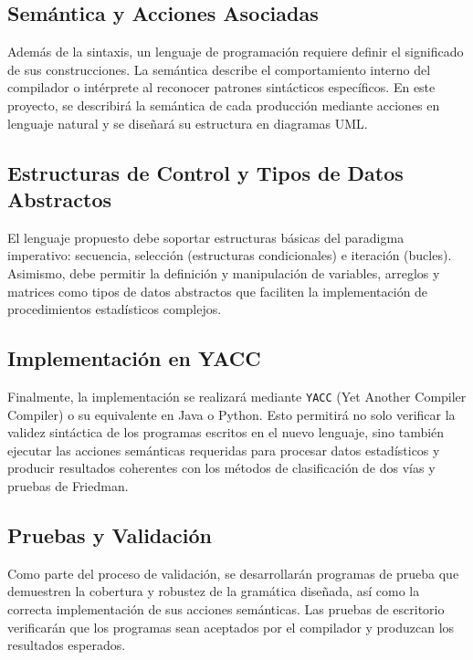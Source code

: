\documentclass{article}
\begin{document}
\subsection*{Semántica y Acciones Asociadas}

Además de la sintaxis, un lenguaje de programación requiere definir el significado de sus construcciones. La semántica describe el comportamiento interno del compilador o intérprete al reconocer patrones sintácticos específicos. En este proyecto, se describirá la semántica de cada producción mediante acciones en lenguaje natural y se diseñará su estructura en diagramas UML.

\subsection*{Estructuras de Control y Tipos de Datos Abstractos}

El lenguaje propuesto debe soportar estructuras básicas del paradigma imperativo: secuencia, selección (estructuras condicionales) e iteración (bucles). Asimismo, debe permitir la definición y manipulación de variables, arreglos y matrices como tipos de datos abstractos que faciliten la implementación de procedimientos estadísticos complejos.

\subsection*{Implementación en YACC}

Finalmente, la implementación se realizará mediante \texttt{YACC} (Yet Another Compiler Compiler) o su equivalente en Java o Python. Esto permitirá no solo verificar la validez sintáctica de los programas escritos en el nuevo lenguaje, sino también ejecutar las acciones semánticas requeridas para procesar datos estadísticos y producir resultados coherentes con los métodos de clasificación de dos vías y pruebas de Friedman.

\subsection*{Pruebas y Validación}

Como parte del proceso de validación, se desarrollarán programas de prueba que demuestren la cobertura y robustez de la gramática diseñada, así como la correcta implementación de sus acciones semánticas. Las pruebas de escritorio verificarán que los programas sean aceptados por el compilador y produzcan los resultados esperados.
\end{document}

